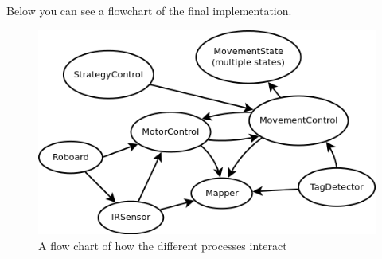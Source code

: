 Below you can see a flowchart of the final implementation.

\begin{figure}[h]
\label{fig:flow_chart}
    \begin{centering}
   	 \includegraphics[scale=0.5]{figures/flow_chart.png}
   	 \caption{A flow chart of how the different processes interact}\label{fig:flow_chart}
    \end{centering}
\end{figure}

